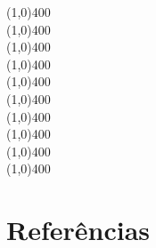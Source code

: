 \begin{refsection}
\begin{center}
\noindent\line(1,0){400}\\
\line(1,0){400}\\
\line(1,0){400}\\
\line(1,0){400}\\
\line(1,0){400}\\
\line(1,0){400}\\
\line(1,0){400}\\
\line(1,0){400}\\
\line(1,0){400}\\
\line(1,0){400}\\
\end{center}
\newpage
\section{Referências}\label{tut7:refs}
\printbibliography[heading=none]
\end{refsection}
%

